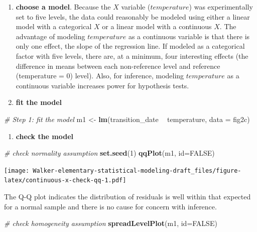 \documentclass[]{book}
\newenvironment{Shaded}{\begin{snugshade}}{\end{snugshade}}
\newcommand{\CommentTok}[1]{\textcolor[rgb]{0.56,0.35,0.01}{\textit{#1}}}
\newcommand{\DataTypeTok}[1]{\textcolor[rgb]{0.13,0.29,0.53}{#1}}
\newcommand{\DecValTok}[1]{\textcolor[rgb]{0.00,0.00,0.81}{#1}}
\newcommand{\KeywordTok}[1]{\textcolor[rgb]{0.13,0.29,0.53}{\textbf{#1}}}
\newcommand{\NormalTok}[1]{#1}
\newcommand{\OperatorTok}[1]{\textcolor[rgb]{0.81,0.36,0.00}{\textbf{#1}}}
\newcommand{\OtherTok}[1]{\textcolor[rgb]{0.56,0.35,0.01}{#1}}
\newcommand{\StringTok}[1]{\textcolor[rgb]{0.31,0.60,0.02}{#1}}
\providecommand{\tightlist}{%
  \setlength{\itemsep}{0pt}\setlength{\parskip}{0pt}}
\begin{document}
\begin{enumerate}
\def\labelenumi{\arabic{enumi}.}
\setcounter{enumi}{1}
\item
  \textbf{choose a model}. Because the \(X\) variable (\(temperature\)) was experimentally set to five levels, the data could reasonably be modeled using either a linear model with a categorical \(X\) or a linear model with a continuous \(X\). The advantage of modeling \(temperature\) as a continuous variable is that there is only one effect, the slope of the regression line. If modeled as a categorical factor with five levels, there are, at a minimum, four interesting effects (the difference in means between each non-reference level and reference (temperature = 0) level). Also, for inference, modeling \(temperature\) as a continuous variable increases power for hypothesis tests.
\item
  \textbf{fit the model}
\end{enumerate}

\begin{Shaded}
\begin{Highlighting}[]
\CommentTok{# Step 1: fit the model}
\NormalTok{m1 <-}\StringTok{ }\KeywordTok{lm}\NormalTok{(transition_date }\OperatorTok{~}\StringTok{ }\NormalTok{temperature, }\DataTypeTok{data =}\NormalTok{ fig2c)}
\end{Highlighting}
\end{Shaded}

\begin{enumerate}
\def\labelenumi{\arabic{enumi}.}
\setcounter{enumi}{3}
\tightlist
\item
  \textbf{check the model}
\end{enumerate}

\begin{Shaded}
\begin{Highlighting}[]
\CommentTok{# check normality assumption}
\KeywordTok{set.seed}\NormalTok{(}\DecValTok{1}\NormalTok{)}
\KeywordTok{qqPlot}\NormalTok{(m1, }\DataTypeTok{id=}\OtherTok{FALSE}\NormalTok{)}
\end{Highlighting}
\end{Shaded}

\texttt{[image: Walker-elementary-statistical-modeling-draft\_files/figure-latex/continuous-x-check-qq-1.pdf]}

The Q-Q plot indicates the distribution of residuals is well within that expected for a normal sample and there is no cause for concern with inference.

\begin{Shaded}
\begin{Highlighting}[]
\CommentTok{# check homogeneity assumption}
\KeywordTok{spreadLevelPlot}\NormalTok{(m1, }\DataTypeTok{id=}\OtherTok{FALSE}\NormalTok{)}
\end{Highlighting}
\end{Shaded}
\end{document}
